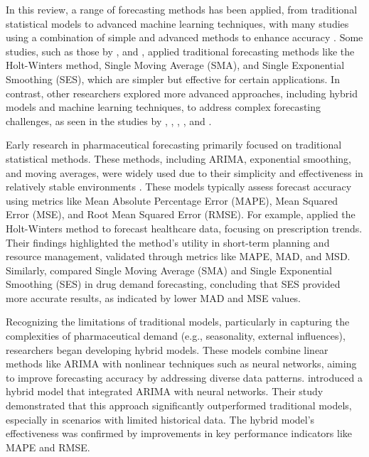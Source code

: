 \documentclass[
  authoryear,
  preprint,
  3p]{elsarticle}
\begin{document}
In this review, a range of forecasting methods has been applied, from
traditional statistical models to advanced machine learning techniques,
with many studies using a combination of simple and advanced methods to
enhance accuracy
\citep{nikolopoulos2016forecasting, zhu2021demand, anusha2014demand}.
Some studies, such as those by \citet{newberne2006holt}, and
\citet{restyana2021analysis}, applied traditional forecasting methods
like the Holt-Winters method, Single Moving Average (SMA), and Single
Exponential Smoothing (SES), which are simpler but effective for certain
applications. In contrast, other researchers explored more advanced
approaches, including hybrid models and machine learning techniques, to
address complex forecasting challenges, as seen in the studies by
\citet{siddiqui2022hybrid}, \citet{de2021lead}, \citet{kim2015demand},
\citet{candan2014demand}, and \citet{ribeiro2017improving}.

Early research in pharmaceutical forecasting primarily focused on
traditional statistical methods. These methods, including ARIMA,
exponential smoothing, and moving averages, were widely used due to
their simplicity and effectiveness in relatively stable environments
\citep{zahra2019forecasting}. These models typically assess forecast
accuracy using metrics like Mean Absolute Percentage Error (MAPE), Mean
Squared Error (MSE), and Root Mean Squared Error (RMSE). For example,
\citet{newberne2006holt} applied the Holt-Winters method to forecast
healthcare data, focusing on prescription trends. Their findings
highlighted the method's utility in short-term planning and resource
management, validated through metrics like MAPE, MAD, and MSD.
Similarly, \citet{restyana2021analysis} compared Single Moving Average
(SMA) and Single Exponential Smoothing (SES) in drug demand forecasting,
concluding that SES provided more accurate results, as indicated by
lower MAD and MSE values.

Recognizing the limitations of traditional models, particularly in
capturing the complexities of pharmaceutical demand (e.g., seasonality,
external influences), researchers began developing hybrid models. These
models combine linear methods like ARIMA with nonlinear techniques such
as neural networks, aiming to improve forecasting accuracy by addressing
diverse data patterns. \citet{khalil2014intelligent} introduced a hybrid
model that integrated ARIMA with neural networks. Their study
demonstrated that this approach significantly outperformed traditional
models, especially in scenarios with limited historical data. The hybrid
model's effectiveness was confirmed by improvements in key performance
indicators like MAPE and RMSE.
\end{document}
